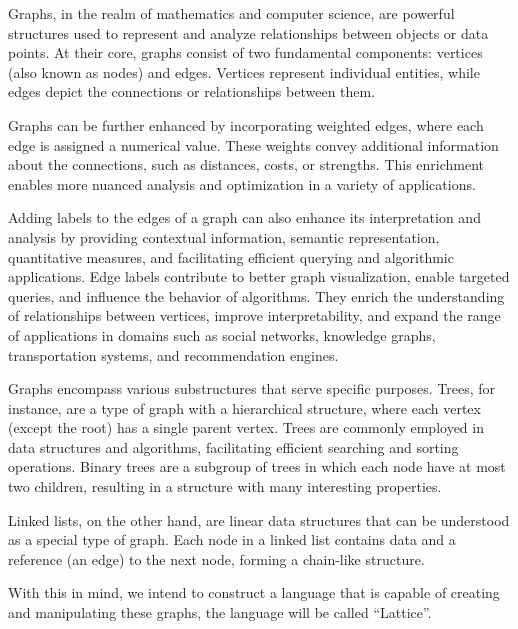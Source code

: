 Graphs, in the realm of mathematics and computer science, are powerful structures used to represent and analyze relationships between objects or data points.
At their core, graphs consist of two fundamental components: vertices (also known as nodes) and edges.
Vertices represent individual entities, while edges depict the connections or relationships between them.

Graphs can be further enhanced by incorporating weighted edges, where each edge is assigned a numerical value.
These weights convey additional information about the connections, such as distances, costs, or strengths.
This enrichment enables more nuanced analysis and optimization in a variety of applications.

Adding labels to the edges of a graph can also enhance its interpretation and analysis by providing contextual information, semantic representation, quantitative measures, and facilitating efficient querying and algorithmic applications.
Edge labels contribute to better graph visualization, enable targeted queries, and influence the behavior of algorithms.
They enrich the understanding of relationships between vertices, improve interpretability, and expand the range of applications in domains such as social networks, knowledge graphs, transportation systems, and recommendation engines.

Graphs encompass various substructures that serve specific purposes.
Trees, for instance, are a type of graph with a hierarchical structure, where each vertex (except the root) has a single parent vertex.
Trees are commonly employed in data structures and algorithms, facilitating efficient searching and sorting operations.
Binary trees are a subgroup of trees in which each node have at most two children, resulting in a structure with many interesting properties.

Linked lists, on the other hand, are linear data structures that can be understood as a special type of graph.
Each node in a linked list contains data and a reference (an edge) to the next node, forming a chain-like structure.

With this in mind, we intend to construct a language that is capable of creating and manipulating these graphs, the
language will be called ``Lattice''.
